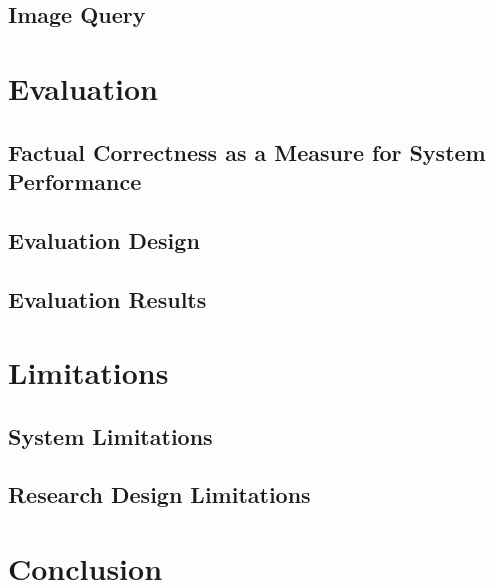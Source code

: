 \documentclass[11pt,a4paper,twoside]{article}
\begin{document}
\subsection{Image Query} \label{SystemQuery}


\cleardoublepage

\section{Evaluation} \label{Eval}

\subsection{Factual Correctness as a Measure for System Performance} \label{EvalFacts}

\subsection{Evaluation Design} \label{EvalDesign}

\subsection{Evaluation Results} \label{EvalResults}


\cleardoublepage

\section{Limitations} \label{Limits}

\subsection{System Limitations} \label{LimitsSystem}

\subsection{Research Design Limitations} \label{LimitsEval}


\cleardoublepage

\section{Conclusion} \label{Conclusion}
\end{document}
